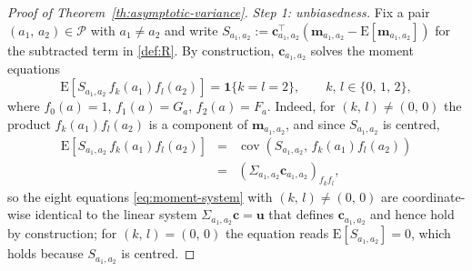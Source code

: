 \documentclass[sigconf,nonacm]{acmart}
\newcommand{\E}{\mathrm E}
\DeclareMathOperator{\cov}{cov}
\begin{document}
\begin{proof}[Proof of Theorem~\ref{th:asymptotic-variance}]
    \emph{Step 1: unbiasedness.} Fix a pair $(a_1,\,a_2)\in\mathcal P$ with $a_1\neq a_2$ and write $S_{a_1,a_2} := \mathbf c_{a_1,a_2}^{\top}(\mathbf m_{a_1,a_2}-\E[\mathbf m_{a_1,a_2}])$ for the subtracted term in \eqref{def:R}. By construction, $\mathbf c_{a_1,a_2}$ solves the moment equations
    \begin{equation}\label{eq:moment-system}
        \E\left[S_{a_1,a_2}\, f_k(a_1)f_l(a_2)\right] = \mathbf 1\{k=l=2\},\qquad k,\,l\in\{0,\,1,\,2\},
    \end{equation}
    where $f_0(a)=1$, $f_1(a)=G_a$, $f_2(a)=F_a$. Indeed, for $(k,\,l)\neq(0,\,0)$ the product $f_k(a_1)f_l(a_2)$ is a component of $\mathbf m_{a_1,a_2}$, and since $S_{a_1,a_2}$ is centred,
    \begin{eqnarray*}
        \E\left[S_{a_1,a_2}\, f_k(a_1)f_l(a_2)\right] &=& \cov\left(S_{a_1,a_2},\,f_k(a_1)f_l(a_2)\right)\\
        &=& \left(\Sigma_{a_1,a_2}\mathbf c_{a_1,a_2}\right)_{f_kf_l},
    \end{eqnarray*}
    so the eight equations \eqref{eq:moment-system} with $(k,\,l)\neq(0,\,0)$ are coordinate-wise identical to the linear system $\Sigma_{a_1,a_2}\mathbf c = \mathbf u$ that defines $\mathbf c_{a_1,a_2}$ and hence hold by construction; for $(k,\,l)=(0,\,0)$ the equation reads $\E[S_{a_1,a_2}]=0$, which holds because $S_{a_1,a_2}$ is centred.


\end{proof}
\end{document}
